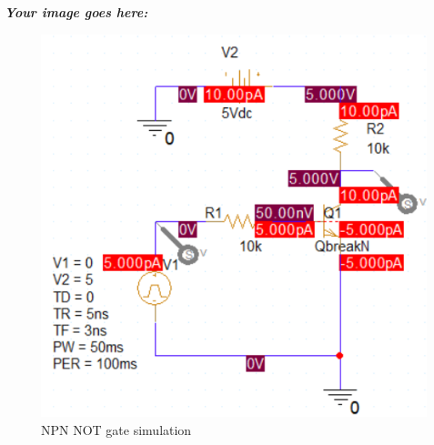 \newpage
\textbf{\textit{Your image goes here:}}\\

\begin{figure}[H]
    \centering
    \includegraphics[width=\linewidth]{graphics/ex12/f2.png}
    \caption{NPN NOT gate simulation}
\end{figure}
